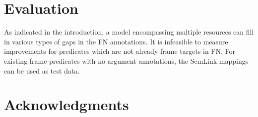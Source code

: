 \documentclass[11pt]{article}
\begin{document}
\section{Evaluation}
As indicated in the introduction, a model encompassing multiple resources can fill in various types of gaps in the FN annotations. It is infeasible to measure improvements for predicates which are not already frame targets in FN. For existing frame-predicates with no argument annotations, the SemLink mappings can be used as test data.

\section*{Acknowledgments}



\end{document}
